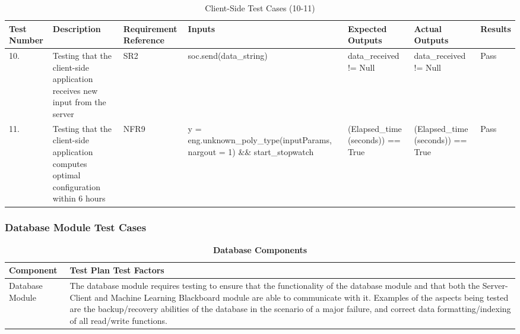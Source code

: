 \documentclass[12pt, titlepage]{article}
\begin{document}
\begin{center}
    \begin{table}[H]
        \centering
        \begin{tabular}{|p{1cm}|p{2.2cm}|p{2.5cm}|p{2.7cm}|p{2.4cm}|p{2.4cm}|p{1.3cm}|}
        \hline
        \bf Test Number & \bf Description & \bf Requirement Reference & \bf Inputs & \bf Expected Outputs & \bf Actual Outputs & \bf Results \\
        \hline
        10. & Testing that the client-side application receives new input from the server & SR2 & soc.\newline send(data\_string) & data\_received != Null & data\_received != Null & Pass\\
        \hline
        11. & Testing that the client-side application computes optimal configuration within 6 hours & NFR9 & y = eng.unknown\_\newline poly\_type\newline (inputParams, nargout = 1) \&\& start_stopwatch & (Elapsed\_time \leq 21600 \newline (seconds)) == True & (Elapsed\_time \leq 21600 \newline (seconds)) == True & Pass\\
        \hline
        \end{tabular}
        \caption{Client-Side Test Cases (10-11)}
        \label{tab:my_label10}
    \end{table}
\end{center}

\subsubsection{Database Module Test Cases}
\begin{center}
\begin{table}[H]
\centering
\begin{tabular}{ |p{5cm}|p{10cm}|  } 
 \hline
\bf Component & \bf Test Plan Test Factors\\
\hline
 Database Module & The database module requires testing to ensure that the functionality of the database module and that both the Server-Client and Machine Learning Blackboard module are able to communicate with it. Examples of the aspects being tested are the backup/recovery abilities of the database in the scenario of a major failure, and correct data formatting/indexing of all read/write functions.\\
 \hline
\end{tabular}
\caption{\bf Database Components}
\label{tab:my_label11}
\end{table}
\end{center}
\end{document}
